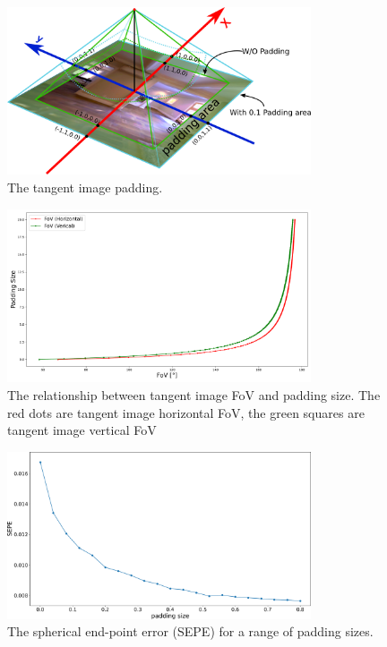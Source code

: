 \documentclass{bmvc2k}
\begin{document}
\begin{figure}[hbt!]
	\centering
	\includegraphics[width=0.80\textwidth]{images/tangent_image/tangent_image_padding.pdf}
	\caption{\label{fig:sup:howtopadding}%
		The tangent image padding.}
\end{figure}

\begin{figure}[hbt!]
	\centering
	\includegraphics[width=0.80\textwidth]{images/paddingsize_vs_fov.pdf}
	\caption{\label{fig:sup:paddingvsfov}%
		The relationship between tangent image FoV and padding size. The red dots are tangent image horizontal FoV, the green squares are tangent image vertical FoV}
\end{figure}

\begin{figure}[hbt!]
	\centering
	\includegraphics[width=0.80\textwidth]{images/abla_padding.pdf}
	\caption{\label{fig:sup:ablationpadding}%
		The spherical end-point error (SEPE) for a range of padding sizes.}
\end{figure}
\end{document}
